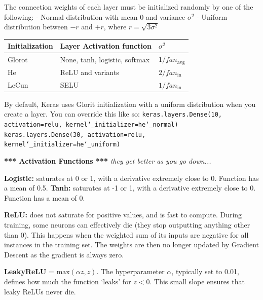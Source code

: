 The connection weights of each layer must be initialized randomly by one of the following:\newline
- Normal distribution with mean 0 and variance $\sigma^2$\newline
- Uniform distribution between $-r$ and $+r$, where $r=\sqrt{3 \sigma^2}$ 

\begin{tabular}{ l|l|l } 

Initialization & Layer Activation function & $\sigma^2$ \\ 
\hline
Glorot & None, tanh, logistic, softmax & $1/fan_{\textrm{avg}}$\\
He & ReLU and variants & $2/fan_{\textrm{in}}$\\
LeCun & SELU & $1/fan_{\textrm{in}}$\\
\end{tabular}

By default, Keras uses Glorit initialization with a uniform distribution when you create a layer.\newline
You can override this like so:\newline
\texttt{keras.layers.Dense(10, activation=\textquotesingle relu\textquotesingle, kernel\char`_initializer=\textquotesingle he\char`_normal\textquotesingle)}
\texttt{keras.layers.Dense(30, activation=\textquotesingle relu\textquotesingle, kernel\char`_initializer=\textquotesingle he\char`_uniform\textquotesingle)}\newline

\textbf{*** Activation Functions ***} \textit{they get better as you go down...}

\textbf{Logistic:} saturates at 0 or 1, with a derivative extremely close to 0. Function has a mean of 0.5.\newline
\textbf{Tanh:} saturates at -1 or 1, with a derivative extremely close to 0. Function has a mean of 0.

\textbf{ReLU:} does not saturate for positive values, and is fast to compute.\newline
During training, some neurons can effectively die (they stop outputting anything other than 0).\newline
This happens when the weighted sum of its inputs are negative for all instances in the training set.
The weights are then no longer updated by Gradient Descent as the gradient is always zero.

\textbf{LeakyReLU} = $\textrm{max}(\alpha z, z)$.
The hyperparameter $\alpha$, typically set to 0.01, defines how much the function `leaks' for $z<0$.
This small slope ensures that leaky ReLUs never die.

